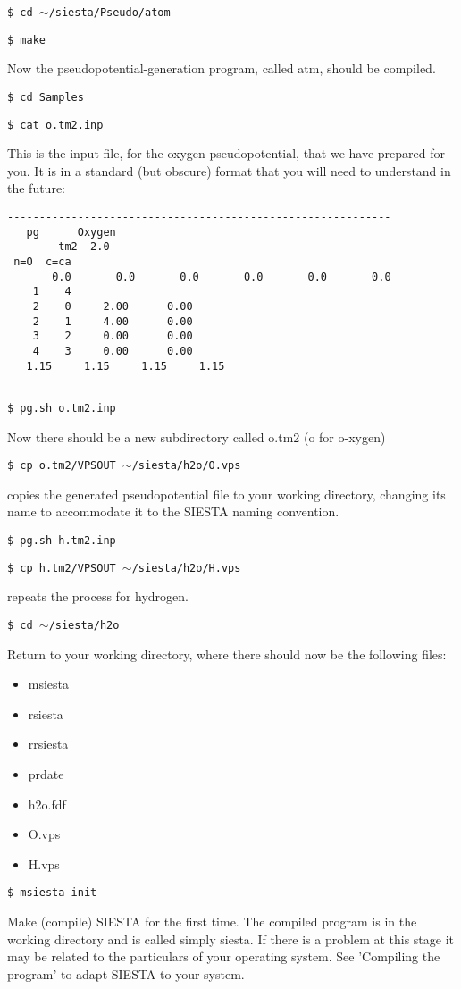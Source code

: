 {\tt \$ cd $\sim$/siesta/Pseudo/atom}

{\tt \$ make}

\noindent
Now the pseudopotential-generation program, called atm, 
should be compiled.

{\tt \$ cd Samples}

{\tt \$ cat o.tm2.inp}

\noindent
This is the input file, for the oxygen pseudopotential, 
that we have prepared for you. 
It is in a standard (but obscure) format that
you will need to understand in the future:
\begin{verbatim}
------------------------------------------------------------
   pg      Oxygen
        tm2  2.0
 n=O  c=ca 
       0.0       0.0       0.0       0.0       0.0       0.0
    1    4
    2    0     2.00      0.00
    2    1     4.00      0.00
    3    2     0.00      0.00
    4    3     0.00      0.00
   1.15     1.15     1.15     1.15
------------------------------------------------------------
\end{verbatim}

{\tt \$ pg.sh o.tm2.inp}

\noindent
Now there should be a new subdirectory called o.tm2 (o for o-xygen)

{\tt \$ cp o.tm2/VPSOUT $\sim$/siesta/h2o/O.vps}

\noindent
copies the generated pseudopotential file to your working directory, 
changing its name to accommodate it to the SIESTA naming convention.

{\tt \$ pg.sh h.tm2.inp}

{\tt \$ cp h.tm2/VPSOUT $\sim$/siesta/h2o/H.vps}

\noindent
repeats the process for hydrogen.

{\tt \$ cd $\sim$/siesta/h2o}

\noindent
Return to your working directory, where there should now be
the following files:
\begin{itemize}
\item msiesta
\item rsiesta
\item rrsiesta
\item prdate
\item h2o.fdf
\item O.vps
\item H.vps
\end{itemize}

{\tt \$ msiesta init}

\noindent
Make (compile) SIESTA for the first time. 
The compiled program
is in the working directory and is called simply siesta.
If there is a problem at this
stage it may be related to the particulars of your operating system.
See 'Compiling the program' to adapt SIESTA to your system.

